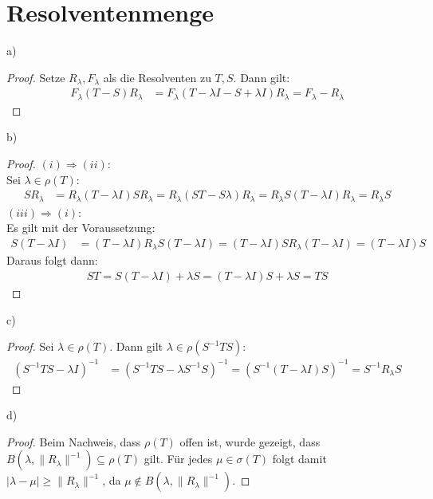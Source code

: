 \documentclass[a4paper,12pt]{article}
\newcommand{\kla}{}
\begin{document}
\section{Resolventenmenge}
a)
\begin{proof}
Setze $R_\lambda, F_\lambda$ als die Resolventen zu $T, S$. Dann gilt:
\begin{align*}
F_\lambda (T-S)R_\lambda&=F_\lambda (T-\lambda I-S+\lambda I)R_\lambda=F_\lambda - R_\lambda
\end{align*}
\end{proof}
b)
\begin{proof}
$(i)\Rightarrow(ii)$:\\
Sei $\lambda\in\rho(T)$:
\begin{align*}
SR_\lambda&=R_\lambda (T-\lambda I)SR_\lambda=R_\lambda (ST-S\lambda)R_\lambda=R_\lambda S(T-\lambda I)R_\lambda =R_\lambda S
\end{align*}
$(iii)\Rightarrow(i)$:\\
Es gilt mit der Voraussetzung:
\begin{align*}
S(T-\lambda I)&= (T-\lambda I)R_\lambda S(T-\lambda I)=(T-\lambda I)SR_\lambda (T-\lambda I)=(T-\lambda I)S
\end{align*}
Daraus folgt dann:
\begin{align*}
ST=S(T-\lambda I)+\lambda S=(T-\lambda I)S+\lambda S=TS
\end{align*}
\end{proof}
c)
\begin{proof}
Sei $\lambda\in\rho(T)$. Dann gilt $\lambda\in\rho (S^{-1}TS)$:
\begin{align*}
\kla\left( {S^{-1}TS-\lambda I} \right)^{-1}&=\kla\left( {S^{-1}TS-\lambda S^{-1}S} \right)^{-1}=\kla\left( {S^{-1}(T-\lambda I)S} \right)^{-1}=S^{-1}R_\lambda S
\end{align*}
\end{proof}
d)
\begin{proof}
Beim Nachweis, dass $\rho(T)$ offen ist, wurde gezeigt, dass $B(\lambda,\|R_\lambda\|^{-1})\subseteq\rho(T)$ gilt. Für jedes $\mu\in\sigma(T)$ folgt damit $|\lambda-\mu|\ge \|R_\lambda\|^{-1}$, da $\mu\notin B(\lambda, \|R_\lambda\|^{-1})$.
\end{proof}
\end{document}
